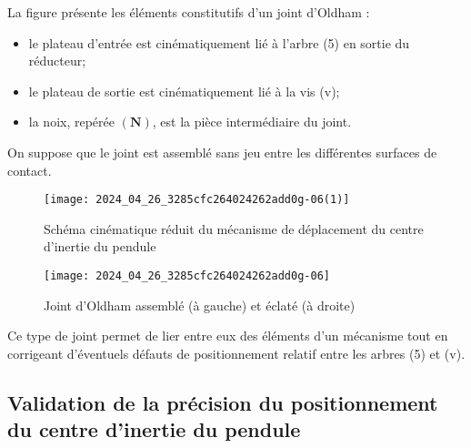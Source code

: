 La figure \label{ccmp2023_fig_07} présente les éléments constitutifs d'un joint d'Oldham :

\begin{itemize}
  \item le plateau d'entrée est cinématiquement lié à l'arbre (5) en sortie du réducteur;
  \item le plateau de sortie est cinématiquement lié à la vis (v);
  \item la noix, repérée $(\mathbf{N})$, est la pièce intermédiaire du joint.
\end{itemize}

On suppose que le joint est assemblé sans jeu entre les différentes surfaces de contact.

\begin{figure}[!h]
\centering
\texttt{[image: 2024\_04\_26\_3285cfc264024262add0g-06(1)]}
\caption{\label{ccmp2023_fig_06} Schéma cinématique réduit du mécanisme de déplacement du centre d'inertie du pendule}
\end{figure}

\begin{figure}[!h]
\centering
\texttt{[image: 2024\_04\_26\_3285cfc264024262add0g-06]}
\caption{\label{ccmp2023_fig_07} Joint d'Oldham assemblé (à gauche) et éclaté (à droite)}
\end{figure}



Ce type de joint permet de lier entre eux des éléments d'un mécanisme tout en corrigeant d'éventuels défauts de positionnement relatif entre les arbres (5) et (v).




\subsection{Validation de la précision du positionnement du centre d'inertie du pendule}

